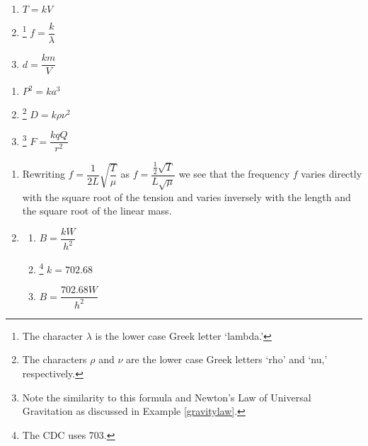 \begin{multicols}{3}
\begin{enumerate}
\setcounter{enumi}{\value{HW}}

\item $T = k V$

\item \hspace{-.1in} \footnote{The character $\lambda$ is the lower case Greek letter `lambda.'} $f = \dfrac{k}{\lambda}$

\item $d = \dfrac{k m}{V}$ 

\setcounter{HW}{\value{enumi}}
\end{enumerate}
\end{multicols}


\begin{multicols}{3}
\begin{enumerate}
\setcounter{enumi}{\value{HW}}

\item $P^2 = k a^3$

\item \hspace{-.1in} \footnote{The characters $\rho$ and $\nu$ are the lower case Greek letters `rho' and `nu,' respectively.} $D = k \rho \nu^2$

\item \hspace{-.1in} \footnote{Note the similarity to this formula and Newton's Law of Universal Gravitation as discussed in Example \ref{gravitylaw}.}  $F = \dfrac{kqQ}{r^2}$   

\setcounter{HW}{\value{enumi}}
\end{enumerate}
\end{multicols}

\begin{enumerate}
\setcounter{enumi}{\value{HW}}

\item Rewriting $f = \dfrac{1}{2L} \sqrt{\dfrac{T}{\mu}}$ as $f = \dfrac{\frac{1}{2} \sqrt{T}}{L \sqrt{\mu}}$ we see that the frequency $f$ varies directly with the square root of the tension and varies inversely with the length and the square root of the linear mass.

\item \begin{multicols}{3} 
\begin{enumerate}
\item $B = \dfrac{kW}{h^{2}}$
\item \hspace{-.1in} \footnote{The CDC uses 703.} $k = 702.68$ 
\item $B = \dfrac{702.68W}{h^{2}}$
\end{enumerate}
\end{multicols}


\end{enumerate}


\closegraphsfile